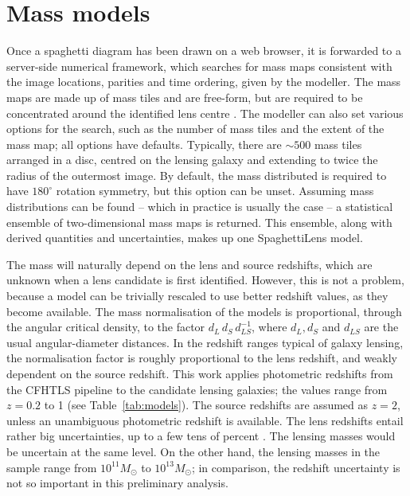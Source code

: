 
\section{Mass models}\label{sec:massmodels}



Once a spaghetti diagram has been drawn on a web browser, it is
forwarded to a server-side numerical framework, which searches for
mass maps consistent with the image locations, parities and time
ordering, given by the modeller.  The mass maps are made up of mass
tiles and are free-form, but are required to be concentrated around
the identified lens centre \citep[see][for the precise formulation of
the search problem]{2014MNRAS.445.2181C}.  The modeller can also set
various options for the search, such as the number of mass tiles and
the extent of the mass map; all options have defaults.  Typically,
there are $\sim500$ mass tiles arranged in a disc, centred on the
lensing galaxy and extending to twice the radius of the outermost
image.  By default, the mass distributed is required to have
$180^\circ$ rotation symmetry, but this option can be unset.  Assuming
mass distributions can be found -- which in practice is usually the
case -- a statistical ensemble of two-dimensional mass maps is
returned.  This ensemble, along with derived quantities and
uncertainties, makes up one SpaghettiLens model.

The mass will naturally depend on the lens and source redshifts, which
are unknown when a lens candidate is first identified.  However, this
is not a problem, because a model can be trivially rescaled to use
better redshift values, as they become available.  The mass
normalisation of the models is proportional, through the angular
critical density, to the factor $d_L\, d_S\, d_{LS}^{-1}$, where
$d_L,d_S$ and $d_{LS}$ are the usual angular-diameter distances.  In
the redshift ranges typical of galaxy lensing, the normalisation
factor is roughly proportional to the lens redshift, and weakly
dependent on the source redshift.  This work applies photometric
redshifts from the CFHTLS pipeline \citep{2009A&A...500..981C} to the
candidate lensing galaxies; the values range from $z=0.2$ to 1 (see
Table~\ref{tab:models}).  The source redshifts are assumed as $z=2$,
unless an unambiguous photometric redshift is available.  The lens
redshifts entail rather big uncertainties, up to a few tens of percent
\citep[see Fig.~5 in][]{2009A&A...500..981C}. The lensing masses would
be uncertain at the same level.  On the other hand, the lensing masses
in the sample range from $10^{11}M_\odot$ to $10^{13}M_\odot$; in
comparison, the redshift uncertainty is not so important in this
preliminary analysis.


